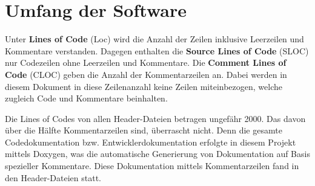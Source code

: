 \documentclass[../review_3.tex]{subfiles}
\begin{document}
\section{Umfang der Software}

Unter \textbf{Lines of Code} (Loc) wird die Anzahl der Zeilen inklusive Leerzeilen und Kommentare verstanden. Dagegen enthalten die \textbf{Source Lines of Code} (SLOC) nur Codezeilen ohne Leerzeilen und Kommentare. Die \textbf{Comment Lines of Code} (CLOC) geben die Anzahl der Kommentarzeilen an. Dabei werden in diesem Dokument in diese Zeilenanzahl keine Zeilen miteinbezogen, welche zugleich Code und Kommentare beinhalten.

Die Lines of Codes von allen Header-Dateien betragen ungefähr 2000. Das davon über die Hälfte Kommentarzeilen sind, überrascht nicht. Denn die gesamte Codedokumentation bzw. Entwicklerdokumentation erfolgte in diesem Projekt mittels Doxygen, was die automatische Generierung von Dokumentation auf Basis spezieller Kommentare. Diese Dokumentation mittels Kommentarzeilen fand in den Header-Dateien statt.
\end{document}
